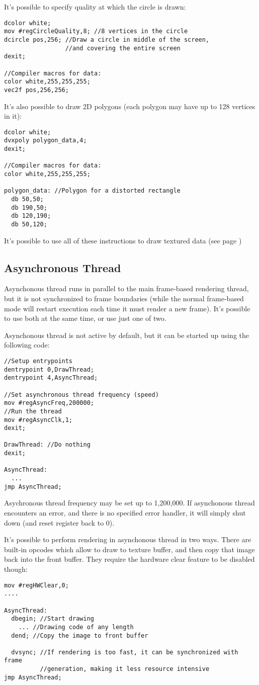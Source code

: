 It's possible to specify quality at which the circle is drawn:
\begin{verbatim}
dcolor white;
mov #regCircleQuality,8; //8 vertices in the circle
dcircle pos,256; //Draw a circle in middle of the screen,
                 //and covering the entire screen
dexit;

//Compiler macros for data:
color white,255,255,255;
vec2f pos,256,256;
\end{verbatim}

It's also possible to draw 2D polygons (each polygon may have up to 128 vertices in it):
\begin{verbatim}
dcolor white;
dvxpoly polygon_data,4;
dexit;

//Compiler macros for data:
color white,255,255,255;

polygon_data: //Polygon for a distorted rectangle
  db 50,50;
  db 190,50;
  db 120,190;
  db 50,120;
\end{verbatim}

It's possible to use all of these instructions to draw textured data (see page \pageref{gputexturing})

\subsection{Asynchronous Thread}
Asynchonous thread runs in parallel to the main frame-based rendering thread, but it is not synchronized to frame boundaries (while the normal frame-based mode will restart execution each time it must render a new frame). It's possible to use both at the same time, or use just one of two.

Asynchonous thread is not active by default, but it can be started up using the following code:
\begin{verbatim}
//Setup entrypoints
dentrypoint 0,DrawThread; 
dentrypoint 4,AsyncThread;

//Set asynchronous thread frequency (speed)
mov #regAsyncFreq,200000;
//Run the thread
mov #regAsyncClk,1; 
dexit;

DrawThread: //Do nothing
dexit;

AsyncThread:
  ...
jmp AsyncThread;
\end{verbatim}

Asychronous thread frequency may be set up to 1,200,000. If asynchonous thread encounters an error, and there is no specified error handler, it will simply shut down (and reset  register back to 0).

It's possible to perform rendering in asynchonous thread in two ways. There are built-in opcodes which allow to draw to texture buffer, and then copy that image back into the front buffer. They require the hardware clear feature to be disabled though:
\begin{verbatim}
mov #regHWClear,0;
....

AsyncThread:
  dbegin; //Start drawing
    ... //Drawing code of any length
  dend; //Copy the image to front buffer
  
  dvsync; //If rendering is too fast, it can be synchronized with frame
          //generation, making it less resource intensive
jmp AsyncThread;
\end{verbatim}

